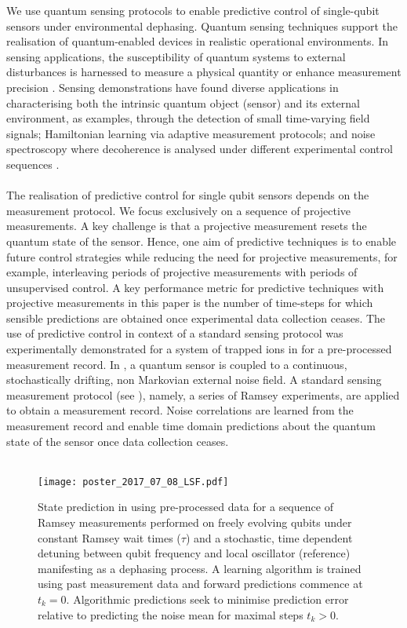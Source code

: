 We use quantum sensing protocols to enable predictive control of single-qubit sensors under environmental dephasing. Quantum sensing techniques support the realisation of quantum-enabled devices in realistic operational environments. In sensing applications, the susceptibility of quantum systems to external disturbances is harnessed to measure a physical quantity or enhance measurement precision \cite{degen2017}. Sensing demonstrations have found diverse applications in characterising both the intrinsic quantum object (sensor) and its external environment, as examples, through the detection of small time-varying field signals; Hamiltonian learning via adaptive measurement protocols; and noise spectroscopy where decoherence is analysed under different experimental control sequences \cite{degen2017, biercuk2011, matsuzaki2017, wiebe2015, lazariev2017}.
\\
\\
The realisation of predictive control for single qubit sensors depends on the measurement protocol. We focus exclusively on a sequence of projective measurements. A key challenge is that a projective measurement resets the quantum state of the sensor. Hence, one aim of predictive techniques is to enable future control strategies while reducing the need for projective measurements, for example, interleaving periods of projective measurements with periods of unsupervised control. A key performance metric for predictive techniques with projective measurements in this paper is the number of time-steps for which sensible predictions are obtained once experimental data collection ceases. The use of predictive control in context of a standard sensing protocol was experimentally demonstrated for a system of trapped ions in \cite{mavadia2017} for a pre-processed measurement record. In \cite{mavadia2017}, a quantum sensor is coupled to a continuous, stochastically drifting, non Markovian external noise field. A  standard sensing measurement protocol (see \cite{mavadia2017, degen2017}), namely, a series of Ramsey experiments, are applied to obtain a measurement record. Noise correlations are learned from the measurement record and enable time domain predictions about the quantum state of the sensor once data collection ceases.
\\
\\
 \begin{figure}[h] \label{fig:vfrey}
 	\caption{State prediction in \cite{mavadia2017} using pre-processed data for a sequence of Ramsey measurements performed on freely evolving qubits under constant Ramsey wait times ($\tau$) and a stochastic, time dependent detuning between qubit frequency and local oscillator (reference) manifesting as a dephasing process. A learning algorithm is trained using past measurement data and forward predictions commence at $t_k=0$. Algorithmic predictions seek to minimise prediction error relative to predicting the noise mean for maximal steps $t_k>0$.}
	\texttt{[image: poster\_2017\_07\_08\_LSF.pdf]}  
\end{figure}
